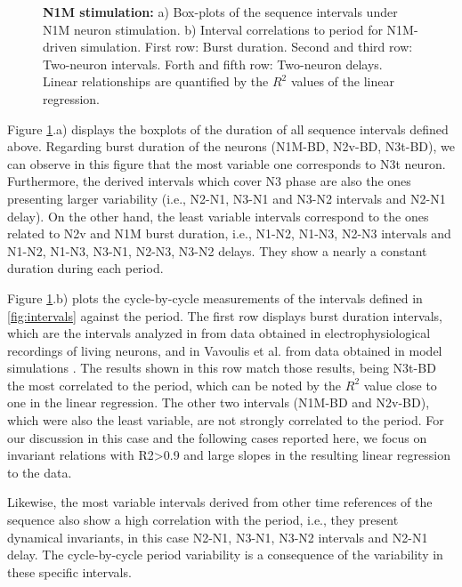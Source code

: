 \begin{figure}[hbt!]
\begin{minipage}[b]{0.53\textwidth}
\begin{minipage}[b]{\textwidth}
		\end{minipage}
	\end{minipage}
	\caption{\textbf{N1M stimulation:} a) Box-plots of the  sequence intervals under N1M neuron stimulation. b) Interval correlations to period for N1M-driven simulation. First row: Burst duration. Second and third row: Two-neuron intervals. Forth and fifth row: Two-neuron delays. Linear relationships are quantified by the $R^2$ values of the linear regression.}
	\label{fig:invariant n1m}
\end{figure}

Figure \ref{fig:invariant n1m}.a) displays the boxplots of the duration of all sequence intervals defined above. Regarding burst duration of the neurons (N1M-BD, N2v-BD, N3t-BD), we can observe in this figure that the most variable one corresponds to N3t neuron. Furthermore, the derived intervals which cover N3 phase are also the ones presenting larger variability (i.e., N2-N1, N3-N1 and N3-N2 intervals and N2-N1 delay). On the other hand, the least variable intervals correspond to the ones related to N2v and N1M burst duration, i.e., N1-N2, N1-N3, N2-N3 intervals and N1-N2, N1-N3, N3-N1, N2-N3, N3-N2 delays. They show a nearly a constant duration during each period.

Figure \ref{fig:invariant n1m}.b) plots the cycle-by-cycle measurements of the intervals defined in \ref{fig:intervals} against the period. The first row displays burst duration intervals, which are the intervals analyzed in \textcite{elliott_temporal_1991} from data obtained in electrophysiological recordings of living neurons, and in Vavoulis et al. from data obtained in model simulations \parencite{vavoulis_dynamic_2007}. The results shown in this row match those results, being N3t-BD the most correlated to the period, which can be noted by the $R^2$ value close to one in the linear regression. The other two intervals (N1M-BD and N2v-BD), which were also the least variable, are not strongly correlated to the period. For our discussion in this case and the following cases reported here, we focus on invariant relations with R2>0.9 and large slopes in the resulting linear regression to the data. 

Likewise, the most variable intervals derived from other time references of the sequence also show a high correlation with the period, i.e., they present dynamical invariants, in this case N2-N1, N3-N1, N3-N2 intervals and N2-N1 delay. The cycle-by-cycle period variability is a consequence of the variability in these specific intervals.

